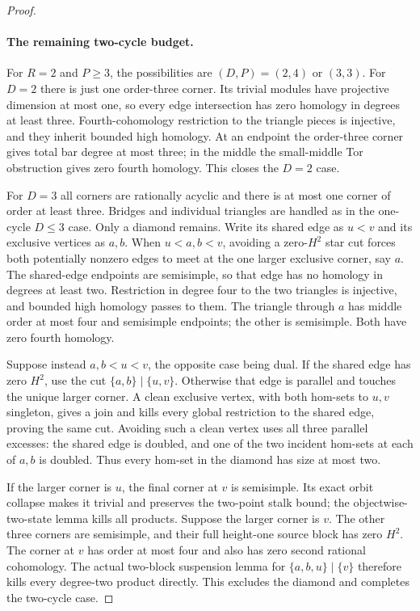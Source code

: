 \begin{proof}
\paragraph{The remaining two-cycle budget.}
For $R=2$ and $P\geq3$, the possibilities are
$(D,P)=(2,4)$ or $(3,3)$.
For $D=2$ there is just one order-three corner.
Its trivial modules have projective dimension at
most one, so every edge intersection has zero
homology in degrees at least three.  Fourth-cohomology
restriction to the triangle pieces is injective,
and they inherit bounded high homology.  At an endpoint
the order-three corner gives total bar degree at
most three; in the middle the small-middle Tor
obstruction gives zero fourth homology.  This closes
the $D=2$ case.

For $D=3$ all corners are rationally acyclic and
there is at most one corner of order at least three.
Bridges and individual triangles are handled as in
the one-cycle $D\leq3$ case.  Only a diamond remains.
Write its shared edge as $u<v$ and its exclusive
vertices as $a,b$.
When $u<a,b<v$, avoiding a zero-$H^2$ star cut forces
both potentially nonzero edges to meet at the one
larger exclusive corner, say $a$.
The shared-edge endpoints are semisimple, so that
edge has no homology in degrees at least two.
Restriction in degree four to the two triangles is
injective, and bounded high homology passes to them.
The triangle through $a$ has middle order at most
four and semisimple endpoints; the other is semisimple.
Both have zero fourth homology.

Suppose instead $a,b<u<v$, the opposite case being
dual.  If the shared edge has zero $H^2$, use the
cut $\{a,b\}\mid\{u,v\}$.  Otherwise that edge is
parallel and touches the unique larger corner.
A clean exclusive vertex, with both hom-sets to
$u,v$ singleton, gives a join and kills every global
restriction to the shared edge, proving the same cut.
Avoiding such a clean vertex uses all three parallel
excesses: the shared edge is doubled, and one of
the two incident hom-sets at each of $a,b$ is doubled.
Thus every hom-set in the diamond has size at most two.

If the larger corner is $u$, the final corner at $v$
is semisimple.  Its exact orbit collapse makes it
trivial and preserves the two-point stalk bound;
the objectwise-two-state lemma kills all products.
Suppose the larger corner is $v$.
The other three corners are semisimple, and their
full height-one source block has zero $H^2$.
The corner at $v$ has order at most four and also
has zero second rational cohomology.  The actual
two-block suspension lemma for
$\{a,b,u\}\mid\{v\}$ therefore kills every
degree-two product directly.  This excludes the
diamond and completes the two-cycle case.


\end{proof}
